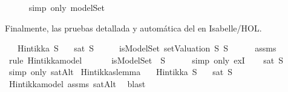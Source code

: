 \begin{isabellebody}
\ \ \ \ \isamarkupfalse%
\ {\isacharparenleft}simp\ only{\isacharcolon}\ modelSet{\isacharparenright}\isanewline
{}\isamarkupfalse%
%
\endisatagproof
{\isafoldproof}%
%
\isadelimproof
%
\endisadelimproof
%
\begin{isamarkuptext}%
Finalmente, las pruebas detallada y automática del 
   en Isabelle/HOL.%
\end{isamarkuptext}\isamarkuptrue%
\isamarkupfalse%
\isanewline
\ \ \ {\isachardoublequoteopen}Hintikka\ S{\isachardoublequoteclose}\isanewline
\ \ \ {\isachardoublequoteopen}sat\ S{\isachardoublequoteclose}\isanewline
%
\isadelimproof
%
\endisadelimproof
%
\isatagproof
{}\isamarkupfalse%
\ {\isacharminus}\isanewline
\ \ \isamarkupfalse%
\ {\isachardoublequoteopen}isModelSet\ {\isacharparenleft}setValuation\ S{\isacharparenright}\ S{\isachardoublequoteclose}\isanewline
\ \ \ \ \isamarkupfalse%
\ assms\ \isamarkupfalse%
\ {\isacharparenleft}rule\ Hintikka{\isacharunderscore}model{\isacharparenright}\isanewline
\ \ \isamarkupfalse%
\ \isamarkupfalse%
\ {\isachardoublequoteopen}{\isasymexists}{\isasymA}{\isachardot}\ isModelSet\ {\isasymA}\ S{\isachardoublequoteclose}\isanewline
\ \ \ \ \isamarkupfalse%
\ {\isacharparenleft}simp\ only{\isacharcolon}\ exI{\isacharparenright}\isanewline
\ \ \isamarkupfalse%
\ {\isachardoublequoteopen}sat\ S{\isachardoublequoteclose}\ \isanewline
\ \ \ \ \isamarkupfalse%
\ {\isacharparenleft}simp\ only{\isacharcolon}\ satAlt{\isacharparenright}\isanewline
{}\isamarkupfalse%
%
\endisatagproof
{\isafoldproof}%
%
\isadelimproof
\isanewline
%
\endisadelimproof
\isanewline
{}\isamarkupfalse%
\ Hintikkaslemma{\isacharcolon}\isanewline
\ \ \ {\isachardoublequoteopen}Hintikka\ S{\isachardoublequoteclose}\isanewline
\ \ \ {\isachardoublequoteopen}sat\ S{\isachardoublequoteclose}\isanewline
%
\isadelimproof
\ \ %
\endisadelimproof
%
\isatagproof
{}\isamarkupfalse%
\ Hintikka{\isacharunderscore}model\ assms\ satAlt\ \isamarkupfalse%
\ blast%
\endisatagproof
{\isafoldproof}%
%
\isadelimproof
%
\endisadelimproof
%
\isadelimtheory
%
\endisadelimtheory
%
\isatagtheory
%
\endisatagtheory
{\isafoldtheory}%
%
\isadelimtheory
%
\endisadelimtheory
%
\end{isabellebody}%
\endinput
